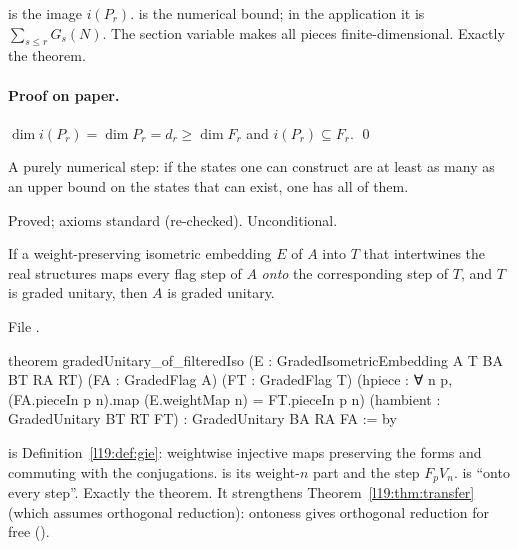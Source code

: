 \begin{dictionary}
 is the image $i(P_r)$.  is the numerical bound; in the application it is $\sum_{s\le r}G_s(N)$. The section
variable \lean{[FiniteDimensional 𝕜 H]} makes all pieces finite-dimensional. Exactly the theorem.
\end{dictionary}

\paragraph{Proof on paper.} $\dim i(P_r)=\dim P_r=d_r\ge\dim F_r$ and $i(P_r)\subseteq F_r$. \qed

\begin{physics}
A purely numerical step: if the states one can construct are at least as many as an upper bound on the states that can exist, one has all
of them.
\end{physics}

\begin{status}
Proved; axioms standard (re-checked). Unconditional.
\end{status}

\begin{theorem}\label{l28:thm:filterediso}
If a weight-preserving isometric embedding $E$ of $A$ into $T$ that intertwines the real structures maps every flag step of $A$ \emph{onto} the
corresponding step of $T$, and $T$ is graded unitary, then $A$ is graded unitary.
\end{theorem}

\noindent File .
\begin{leancode}
theorem gradedUnitary_of_filteredIso
    (E : GradedIsometricEmbedding A T BA BT RA RT)
    (FA : GradedFlag A) (FT : GradedFlag T)
    (hpiece : ∀ n p, (FA.pieceIn p n).map (E.weightMap n) = FT.pieceIn p n)
    (hambient : GradedUnitary BT RT FT) : GradedUnitary BA RA FA := by
\end{leancode}

\begin{dictionary}
 is Definition~\ref{l19:def:gie}: weightwise injective maps preserving the forms and commuting
with the conjugations.  is its weight-$n$ part and  the step $F_pV_n$.  is ``onto every
step''. Exactly the theorem. It strengthens Theorem~\ref{l19:thm:transfer} (which assumes orthogonal reduction): ontoness gives orthogonal
reduction for free ().
\end{dictionary}

